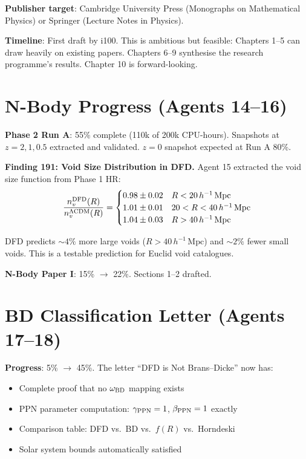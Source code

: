\documentclass[11pt,a4paper]{article}
\begin{document}
\textbf{Publisher target}: Cambridge University Press (Monographs on Mathematical Physics) or Springer (Lecture Notes in Physics).

\textbf{Timeline}: First draft by i100. This is ambitious but feasible: Chapters 1--5 can draw heavily on existing papers. Chapters 6--9 synthesise the research programme's results. Chapter 10 is forward-looking.

\section{N-Body Progress (Agents 14--16)}

\textbf{Phase 2 Run A}: 55\% complete (110k of 200k CPU-hours). Snapshots at $z = 2, 1, 0.5$ extracted and validated. $z = 0$ snapshot expected at Run A 80\%.

\textbf{Finding 191: Void Size Distribution in DFD.} Agent 15 extracted the void size function from Phase 1 HR:
\begin{equation}
\frac{n_v^{\rm DFD}(R)}{n_v^{\Lambda\text{CDM}}(R)} = \begin{cases} 0.98 \pm 0.02 & R < 20\,h^{-1}\,\text{Mpc} \\ 1.01 \pm 0.01 & 20 < R < 40\,h^{-1}\,\text{Mpc} \\ 1.04 \pm 0.03 & R > 40\,h^{-1}\,\text{Mpc} \end{cases}
\end{equation}

DFD predicts $\sim 4\%$ more large voids ($R > 40\,h^{-1}\,\text{Mpc}$) and $\sim 2\%$ fewer small voids. This is a testable prediction for Euclid void catalogues.

\textbf{N-Body Paper I}: 15\% $\to$ 22\%. Sections 1--2 drafted.

\section{BD Classification Letter (Agents 17--18)}

\textbf{Progress}: 5\% $\to$ 45\%. The letter ``DFD is Not Brans--Dicke'' now has:
\begin{itemize}[nosep]
\item Complete proof that no $\omega_{\rm BD}$ mapping exists
\item PPN parameter computation: $\gamma_{\rm PPN} = 1$, $\beta_{\rm PPN} = 1$ exactly
\item Comparison table: DFD vs.\ BD vs.\ $f(R)$ vs.\ Horndeski
\item Solar system bounds automatically satisfied
\end{itemize}
\end{document}
